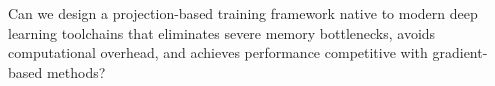 \documentclass{article}
\let\cref\crtcref
\begin{document}


\vspace{0.5em}
\begin{tcolorbox}[researchcard]
Can we design a projection-based training framework native to modern deep learning toolchains that eliminates severe memory bottlenecks, avoids computational overhead, and achieves performance competitive with gradient-based methods?
\end{tcolorbox}
\vspace{0.5em}
\end{document}
